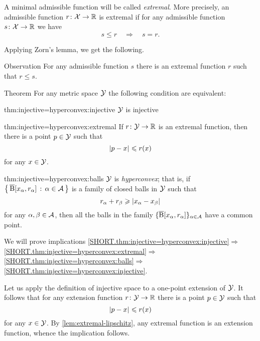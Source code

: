 A minimal admissible function will be called \label{page:extremal function}\emph{extremal}.
More precisely, an admissible function $r\colon\mathcal{X}\to\mathbb{R}$ is extremal 
if for any admissible function $s\colon\mathcal{X}\to\mathbb{R}$ we have
\[s\le r\quad\Longrightarrow\quad s=r.\]

Applying Zorn's lemma, we get the following.

\begin{thm}{Observation}\label{obs:extremal:below}
For any admissible function $s$ there is an extremal function $r$ such that $r\le s$.
\end{thm}

\begin{thm}{Theorem}\label{thm:injective=hyperconvex}
For any metric space $\mathcal{Y}$ the following condition are equivalent:

\begin{subthm}{thm:injective=hyperconvex:injective}
$\mathcal{Y}$ is injective
\end{subthm}


\begin{subthm}{thm:injective=hyperconvex:extremal}
If $r\colon\mathcal{Y}\to\mathbb{R}$ is an extremal function, then there is a point $p\in \mathcal{Y}$ such that 
\[\dist{p}{x}{}\le r(x)\]
for any $x\in \mathcal{Y}$.
\end{subthm}

\begin{subthm}{thm:injective=hyperconvex:balls}
$\mathcal{Y}$ is \emph{hyperconvex};
that is, if $\left\{\,{\overline{\mathrm{B}}{}[x_\alpha,r_\alpha]}\,:\,{\alpha\in\mathcal{A}}\,\right\}$ is a family of closed balls in $\mathcal{Y}$ such that 
 \[r_\alpha+r_\beta\ge \dist{x_\alpha}{x_\beta}{}\]
 for any $\alpha,\beta\in \mathcal{A}$, then all the balls in the family $\{\overline{\mathrm{B}}{}[x_\alpha,r_\alpha]\}_{\alpha\in\mathcal{A}}$ have a common point.
\end{subthm}

\end{thm}

 We will prove implications 
\ref{SHORT.thm:injective=hyperconvex:injective}$\Rightarrow$\ref{SHORT.thm:injective=hyperconvex:extremal}$\Rightarrow$\ref{SHORT.thm:injective=hyperconvex:balls}$\Rightarrow$\ref{SHORT.thm:injective=hyperconvex:injective}.

Let us apply the definition of injective space to a one-point extension of $\mathcal{Y}$.
It follows that for any extension function $r\colon\mathcal{Y}\to\mathbb{R}$ there is a point $p\in \mathcal{Y}$ such that 
\[\dist{p}{x}{}\le r(x)\]
for any $x\in \mathcal{Y}$.
By \ref{lem:extremal-lipschitz}, any extremal function is an extension function, whence the implication follows.

